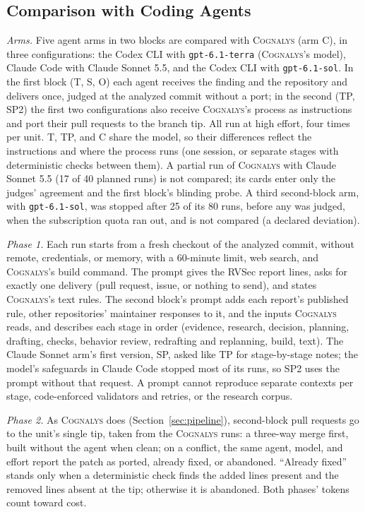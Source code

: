 \documentclass[conference]{IEEEtran}
\newcommand{\system}{\textsc{Cognalys}}
\begin{document}
\subsection{Comparison with Coding Agents}
\label{subsec:protocol}

\emph{Arms.} Five agent arms in two blocks are compared with {\system} (arm
C), in three configurations: the Codex CLI with \texttt{gpt-6.1-terra}
({\system}'s model), Claude Code with Claude Sonnet 5.5, and the Codex CLI
with \texttt{gpt-6.1-sol}. In the first block (T, S, O) each agent receives
the finding and the repository and delivers once, judged at the analyzed
commit without a port; in the second (TP, SP2) the first two configurations
also receive {\system}'s process as instructions and port their pull requests
to the branch tip. All run at high effort, four times per unit. T, TP, and C
share the model, so their differences reflect the instructions and where the
process runs (one session, or separate stages with deterministic checks
between them). A partial run of {\system} with Claude Sonnet 5.5 (17 of 40
planned runs) is not compared; its cards enter only the judges' agreement and
the first block's blinding probe.
A third second-block arm, with \texttt{gpt-6.1-sol}, was stopped after 25 of
its 80 runs, before any was judged, when the subscription quota ran out, and is
not compared (a declared deviation).

\emph{Phase 1.} Each run starts from a fresh checkout of the analyzed commit,
without remote, credentials, or memory, with a 60-minute limit, web search,
and {\system}'s build command. The prompt gives the RVSec report lines, asks
for exactly one delivery (pull request, issue, or nothing to send), and states
{\system}'s text rules. The second block's prompt adds each report's published
rule, other repositories' maintainer responses to it, and the inputs {\system}
reads, and describes each stage in order (evidence, research, decision,
planning, drafting, checks, behavior review, redrafting and replanning, build,
text). The Claude Sonnet arm's first version, SP, asked like TP for
stage-by-stage notes; the model's safeguards in Claude Code stopped most of its
runs, so SP2 uses the prompt without that request. A prompt
cannot reproduce separate contexts per stage, code-enforced validators and
retries, or the research corpus.

\emph{Phase 2.} As {\system} does (Section~\ref{sec:pipeline}), second-block
pull requests go to the unit's single tip, taken from the {\system} runs: a
three-way merge first, built without the agent when clean; on a conflict, the
same agent, model, and effort report the patch as ported, already fixed, or
abandoned. ``Already fixed'' stands only when a deterministic check finds the
added lines present and the removed lines absent at the tip; otherwise it is
abandoned. Both phases' tokens count toward cost.
\end{document}
